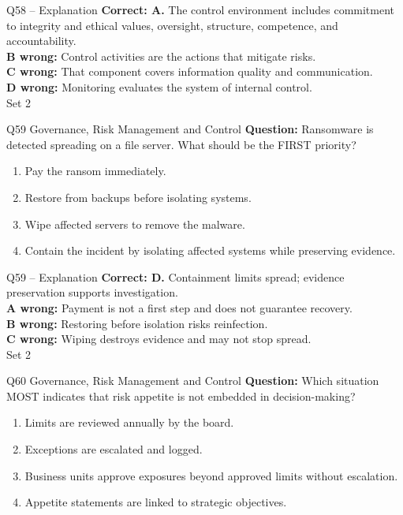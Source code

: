 \documentclass[aspectratio=169,10pt]{beamer}
\begin{document}
\begin{frame}[t]{Q58 -- Explanation}
	\footnotesize
	\textbf{Correct: A.} The control environment includes commitment to integrity and ethical values, oversight, structure, competence, and accountability. \\[5pt]
\textbf{B wrong:} Control activities are the actions that mitigate risks. \\[3pt]
\textbf{C wrong:} That component covers information quality and communication. \\[3pt]
\textbf{D wrong:} Monitoring evaluates the system of internal control. \\[3pt]
	\vfill {\tiny Set 2}
\end{frame}

\begin{frame}[t]{Q59 \hfill {\scriptsize Governance, Risk Management and Control}}
	\small
	\textbf{Question:} Ransomware is detected spreading on a file server. What should be the FIRST priority?
	\begin{enumerate}[label=\Alph*.,itemsep=1pt,topsep=3pt]
			\item Pay the ransom immediately.
			\item Restore from backups before isolating systems.
			\item Wipe affected servers to remove the malware.
			\item Contain the incident by isolating affected systems while preserving evidence.
	\end{enumerate}
\end{frame}

\begin{frame}[t]{Q59 -- Explanation}
	\footnotesize
	\textbf{Correct: D.} Containment limits spread; evidence preservation supports investigation. \\[5pt]
\textbf{A wrong:} Payment is not a first step and does not guarantee recovery. \\[3pt]
\textbf{B wrong:} Restoring before isolation risks reinfection. \\[3pt]
\textbf{C wrong:} Wiping destroys evidence and may not stop spread. \\[3pt]
	\vfill {\tiny Set 2}
\end{frame}

\begin{frame}[t]{Q60 \hfill {\scriptsize Governance, Risk Management and Control}}
	\small
	\textbf{Question:} Which situation MOST indicates that risk appetite is not embedded in decision-making?
	\begin{enumerate}[label=\Alph*.,itemsep=1pt,topsep=3pt]
			\item Limits are reviewed annually by the board.
			\item Exceptions are escalated and logged.
			\item Business units approve exposures beyond approved limits without escalation.
			\item Appetite statements are linked to strategic objectives.
	\end{enumerate}
\end{frame}
\end{document}
